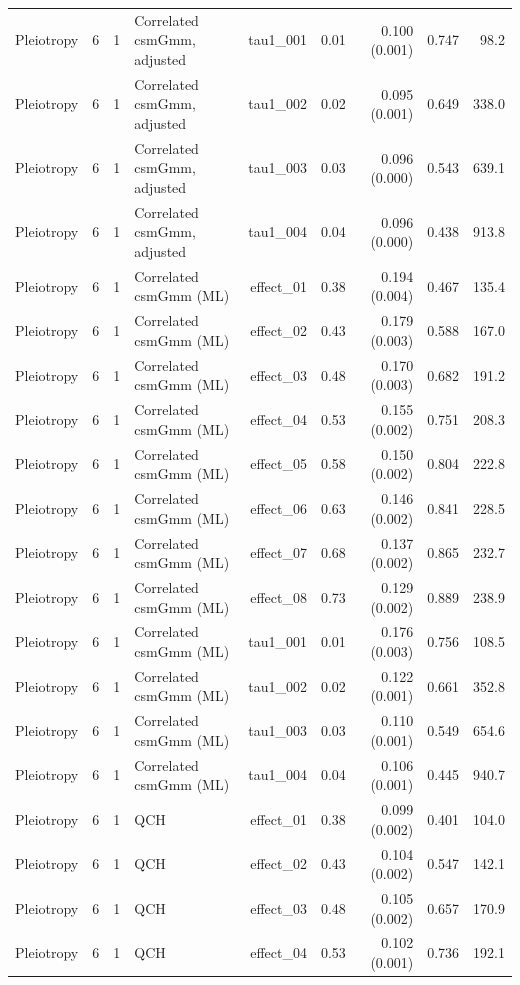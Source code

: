 \begin{longtable}{lcclrrrrr}
Pleiotropy & 6 & 1 & Correlated csmGmm, adjusted & tau1\_001 & 0.01 & 0.100 (0.001) & 0.747 & 98.2\\
Pleiotropy & 6 & 1 & Correlated csmGmm, adjusted & tau1\_002 & 0.02 & 0.095 (0.001) & 0.649 & 338.0\\
Pleiotropy & 6 & 1 & Correlated csmGmm, adjusted & tau1\_003 & 0.03 & 0.096 (0.000) & 0.543 & 639.1\\
Pleiotropy & 6 & 1 & Correlated csmGmm, adjusted & tau1\_004 & 0.04 & 0.096 (0.000) & 0.438 & 913.8\\
Pleiotropy & 6 & 1 & Correlated csmGmm (ML) & effect\_01 & 0.38 & 0.194 (0.004) & 0.467 & 135.4\\
Pleiotropy & 6 & 1 & Correlated csmGmm (ML) & effect\_02 & 0.43 & 0.179 (0.003) & 0.588 & 167.0\\
Pleiotropy & 6 & 1 & Correlated csmGmm (ML) & effect\_03 & 0.48 & 0.170 (0.003) & 0.682 & 191.2\\
Pleiotropy & 6 & 1 & Correlated csmGmm (ML) & effect\_04 & 0.53 & 0.155 (0.002) & 0.751 & 208.3\\
Pleiotropy & 6 & 1 & Correlated csmGmm (ML) & effect\_05 & 0.58 & 0.150 (0.002) & 0.804 & 222.8\\
Pleiotropy & 6 & 1 & Correlated csmGmm (ML) & effect\_06 & 0.63 & 0.146 (0.002) & 0.841 & 228.5\\
Pleiotropy & 6 & 1 & Correlated csmGmm (ML) & effect\_07 & 0.68 & 0.137 (0.002) & 0.865 & 232.7\\
Pleiotropy & 6 & 1 & Correlated csmGmm (ML) & effect\_08 & 0.73 & 0.129 (0.002) & 0.889 & 238.9\\
Pleiotropy & 6 & 1 & Correlated csmGmm (ML) & tau1\_001 & 0.01 & 0.176 (0.003) & 0.756 & 108.5\\
Pleiotropy & 6 & 1 & Correlated csmGmm (ML) & tau1\_002 & 0.02 & 0.122 (0.001) & 0.661 & 352.8\\
Pleiotropy & 6 & 1 & Correlated csmGmm (ML) & tau1\_003 & 0.03 & 0.110 (0.001) & 0.549 & 654.6\\
Pleiotropy & 6 & 1 & Correlated csmGmm (ML) & tau1\_004 & 0.04 & 0.106 (0.001) & 0.445 & 940.7\\
Pleiotropy & 6 & 1 & QCH & effect\_01 & 0.38 & 0.099 (0.002) & 0.401 & 104.0\\
Pleiotropy & 6 & 1 & QCH & effect\_02 & 0.43 & 0.104 (0.002) & 0.547 & 142.1\\
Pleiotropy & 6 & 1 & QCH & effect\_03 & 0.48 & 0.105 (0.002) & 0.657 & 170.9\\
Pleiotropy & 6 & 1 & QCH & effect\_04 & 0.53 & 0.102 (0.001) & 0.736 & 192.1\\

\end{longtable}
